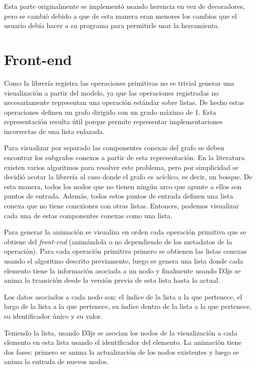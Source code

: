 Esta parte originalmente se implementó usando herencia en vez de decoradores, pero se cambió debido a que de esta manera eran menores los cambios que el usuario debía hacer a su programa para permitirle usar la herramienta.

\section{Front-end}

Como la librería registra las operaciones primitivas no es trivial generar una visualización a partir del modelo, ya que las operaciones registradas no necesariamente representan una operación estándar sobre listas. De hecho estas operaciones definen un grafo dirigido con un grado máximo de 1. Esta representación resulta útil porque permite representar implementaciones incorrectas de una lista enlazada.

Para visualizar por separado las componentes conexas del grafo se deben encontrar los subgrafos conexos a partir de esta representación. En la literatura existen varios algoritmos para resolver este problema, pero por simplicidad se decidió acotar la librería al caso donde el grafo es acíclico, es decir, un bosque. De esta manera, todos los nodos que no tienen ningún arco que apunte a ellos son puntos de entrada. Además, todos estos puntos de entrada definen una lista conexa que no tiene conexiones con otras listas. Entonces, podemos visualizar cada una de estas componentes conexas como una lista.

Para generar la animación se visualiza en orden cada operación primitiva que se obtiene del \textit{front-end} (animándola o no dependiendo de los metadatos de la operación). Para cada operación primitiva primero se obtienen las listas conexas usando el algoritmo descrito previamente, luego se genera una lista donde cada elemento tiene la información asociada a un nodo y finalmente usando D3js se anima la transición desde la versión previa de esta lista hasta la actual.

Los datos asociados a cada nodo son: el índice de la lista a la que pertenece, el largo de la lista a la que pertenece, su índice dentro de la lista a la que pertenece, su identificador único y su valor.

Teniendo la lista, usando D3js se asocian los nodos de la visualización a cada elemento en esta lista usando el identificador del elemento. La animación tiene dos fases: primero se anima la actualización de los nodos existentes y luego se anima la entrada de nuevos nodos.


